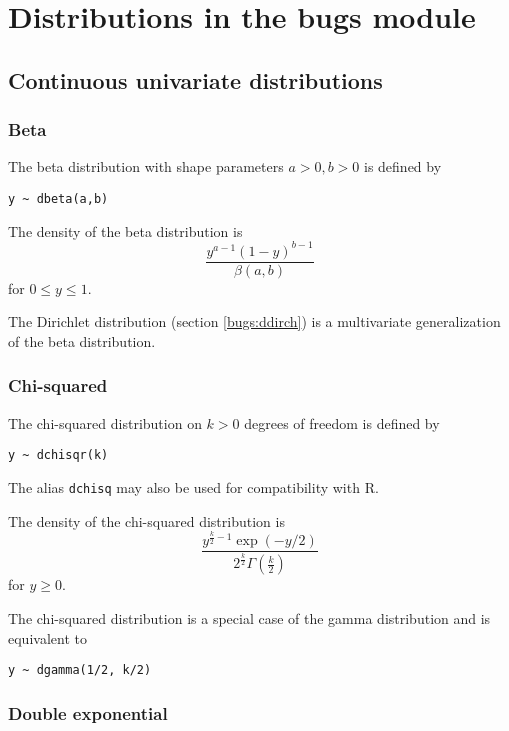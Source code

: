 \documentclass[11pt, a4paper, titlepage]{report}
\begin{document}
\section{Distributions in the bugs module}
\label{section:bugs:distributions}

\subsection{Continuous univariate distributions}

\subsubsection{Beta}
\label{bugs:dbeta}

The beta distribution with shape parameters $a > 0, b > 0$ is defined by
\begin{verbatim}
y ~ dbeta(a,b)
\end{verbatim}
The density of the beta distribution is
\[
\frac{\textstyle y^{a-1}(1-y)^{b-1}}{\textstyle \beta(a,b)}
\]
for $0 \leq y \leq 1$.

The Dirichlet distribution (section \ref{bugs:ddirch}) is a
multivariate generalization of the beta distribution.

\subsubsection{Chi-squared}
\label{bugs:dchisqr}

The chi-squared distribution on $k > 0$ degrees of freedom is defined by
\begin{verbatim}
y ~ dchisqr(k)
\end{verbatim}
The alias \texttt{dchisq} may also be used for compatibility with R.

The density of the chi-squared distribution is
\[
\frac{\textstyle y^{\frac{k}{2} - 1} \exp(-y/2)}
     {\textstyle 2^{\frac{k}{2}} \Gamma({\scriptstyle \frac{k}{2}})}
\]
for $y \geq 0$.

The chi-squared distribution is a special case of the gamma
distribution and is equivalent to
\begin{verbatim}
y ~ dgamma(1/2, k/2)
\end{verbatim}

\subsubsection{Double exponential}
\label{bugs:ddexp}
\end{document}
